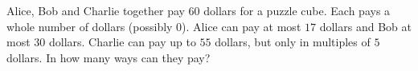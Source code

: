 Alice, Bob and Charlie together pay \(60\) dollars for a puzzle cube. Each pays a whole number of dollars (possibly \(0\)). Alice can pay at most \(17\) dollars and Bob at most \(30\) dollars. Charlie can pay up to \(55\) dollars, but only in multiples of \(5\) dollars. In how many ways can they pay?
